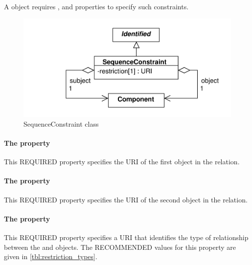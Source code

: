 A  object requires ,  and  properties to specify such constraints.

\begin{figure}[ht]
\begin{center}
\includegraphics[scale=0.6]{uml/sequence_constraint}
\caption[]{SequenceConstraint class}
\label{uml:sequence_constraint}
\end{center}
\end{figure}

\paragraph{The  property}
\label{sec:subject}
This REQUIRED property specifies the  URI of the first  object in the relation.



\paragraph{The  property}
\label{sec:object}
This REQUIRED property specifies the URI  of the second  object in the relation.

\paragraph{The  property}
\label{sec:restriction}

This REQUIRED property specifies a URI that identifies the type of relationship between the  and   objects. 
The RECOMMENDED values for this property are given in \ref{tbl:restriction_types}.

